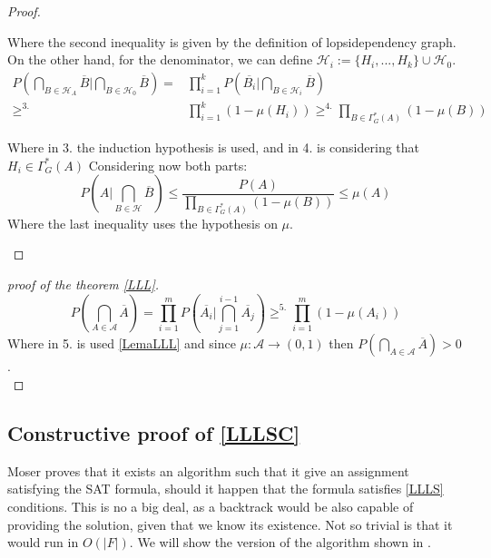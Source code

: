 \begin{proof}
\begin{itemize}
Where the second inequality is given by the definition of lopsidependency graph. On the other hand, for the denominator, we can define $\mathcal{H}_i := \{H_i,...,H_k\} \cup \mathcal{H}_0$.
\begin{align*}
P\left ( \bigcap_{B\in \mathcal{H}_A} \overline{B}  \Big| \bigcap_{B\in \mathcal{H}_0} \overline{B} \right )  = & \prod_{i=1}^k P\left ( \overline{B_i} \Big| \bigcap_{B\in \mathcal{H}_i} \overline{B} \right ) \\  \ge^{3.}  & \prod_{i=1}^k \left (1-\mu(H_i)\right ) 
 \ge^{4.}  \prod_{B\in\Gamma_G^*(A)} \left (1-\mu(B)\right )
\end{align*}

Where in 3. the induction hypothesis is used, and in 4. is considering  that $H_i \in \Gamma_G^*(A)$
Considering now both parts:
\[
P\left ( A \Big| \bigcap_{B\in \mathcal{H}} \overline{B} \right ) \le \frac{P(A)}{\prod_{B\in\Gamma_G^*(A)} \left (1-\mu(B)\right )} \le \mu(A)
\]
Where the last inequality uses the hypothesis on $\mu$.
\end{itemize}
\end{proof}


\begin{proof}[proof of the theorem \ref{LLL}]
\[
P\left ( \bigcap_{A\in \mathcal{A}} \overline{A}\right ) = \prod_{i=1}^m P \left( \overline{A_i} \Big | \bigcap_{j=1}^{i-1} \overline{A_j}\right) \ge^{5.} \prod_{i=1}^m ( 1 - \mu(A_i))
\]
	Where in 5. is used \ref{LemaLLL} and since $\mu:\mathcal{A}\to (0,1)$ then $P\left ( \bigcap_{A\in \mathcal{A}} \overline{A}\right )  > 0$.\\
\end{proof}


\subsection{Constructive proof of \ref{LLLSC}}

Moser\cite{moser2013exact} proves that it exists an algorithm such that it give an assignment satisfying the SAT formula, should it happen that the formula satisfies \ref{LLLS} conditions. This is no a big deal, as a backtrack would be also capable of providing the solution, given that we know its existence. Not so trivial is that it would run in $O(|F|)$. We will show the version of the algorithm shown in \cite{schoning2013satisfiability}.



